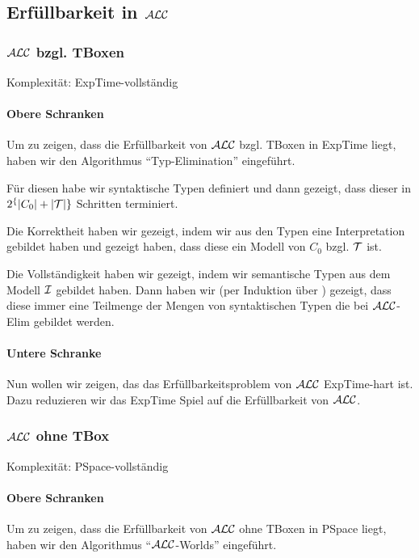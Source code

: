 \subsection{Erfüllbarkeit in $\mathcal{A}\mathcal{L}\mathcal{C}$}

\subsubsection{$\mathcal{A}\mathcal{L}\mathcal{C}$ bzgl. TBoxen}

Komplexität: ExpTime-vollständig

\paragraph{Obere Schranken}

Um zu zeigen, dass die Erfüllbarkeit von $\mathcal{A}\mathcal{L}\mathcal{C}$ bzgl. TBoxen in ExpTime liegt, haben wir den Algorithmus ``Typ-Elimination'' eingeführt.

Für diesen habe wir syntaktische Typen definiert und dann gezeigt, dass dieser in $2^\{|C_0|+|\mathcal{T}|\}$ Schritten terminiert.

Die Korrektheit haben wir gezeigt, indem wir aus den Typen eine Interpretation gebildet haben und gezeigt haben, dass diese ein Modell von $C_0$ bzgl. $\mathcal{T}$ ist.

Die Vollständigkeit haben wir gezeigt, indem wir semantische Typen aus dem Modell $\mathcal{I}$ gebildet haben. Dann haben wir (per Induktion über ) gezeigt, dass diese immer eine Teilmenge der Mengen von syntaktischen Typen die bei $\mathcal{A}\mathcal{L}\mathcal{C}$-Elim gebildet werden.

\paragraph{Untere Schranke}

Nun wollen wir zeigen, das das Erfüllbarkeitsproblem von $\mathcal{A}\mathcal{L}\mathcal{C}$ ExpTime-hart ist. Dazu reduzieren wir das ExpTime Spiel auf die Erfüllbarkeit von $\mathcal{A}\mathcal{L}\mathcal{C}$.

\subsubsection{$\mathcal{A}\mathcal{L}\mathcal{C}$ ohne TBox}

Komplexität: PSpace-vollständig

\paragraph{Obere Schranken}

Um zu zeigen, dass die Erfüllbarkeit von $\mathcal{A}\mathcal{L}\mathcal{C}$ ohne TBoxen in PSpace liegt, haben wir den Algorithmus ``$\mathcal{A}\mathcal{L}\mathcal{C}$-Worlds'' eingeführt.

